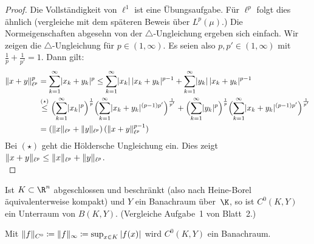 \begin{proof}
    Die Vollständigkeit von $\ell^1$ ist eine Übungsaufgabe. Für $\ell^p$ folgt
    dies ähnlich (vergleiche mit dem späteren Beweis über $L^p(\mu)$.) %
    Die Normeigenschaften abgesehn von der $\triangle$-Ungleichung ergeben sich
    einfach. Wir zeigen die $\triangle$-Ungleichung für $p\in(1,\infty)$. Es
    seien also $p,p'\in(1,\infty)$ mit $\frac{1}{p}+\frac{1}{p'}=1$. Dann gilt:
    \begin{align*}
        \lVert x+y\rVert_{\ell^{p}}^p 
        &= \sum_{k=1}^\infty \lvert x_k+y_k\rvert^p
        \leq \sum_{k=1}^\infty \lvert x_k\rvert \, \lvert x_k+y_k\rvert^{p-1}
        + \sum_{k=1}^\infty \lvert y_k\rvert\, \lvert x_k+y_k\rvert^{p-1}
        \\
        &\overset{(\star)}\leq 
        \Bigl( \sum_{k=1}^\infty \lvert x_k\rvert^p \Bigr)^{\frac{1}{p}}
        \Bigl( \sum_{k=1}^\infty \lvert x_k+y_k\rvert^{(p-1)p'} \Bigr)^{\frac{1}{p'}} 
        +
        \Bigl( \sum_{k=1}^\infty \lvert y_k\rvert^p \Bigr)^{\frac{1}{p}} 
        \Bigl( \sum_{k=1}^\infty \lvert x_k+y_k\rvert^{(p-1)p'} \Bigr)^{\frac{1}{p'}}
        \\
        &= (\lVert x\rVert_{\ell^{p}} + \lVert y\rVert_{\ell^{p}}) \, (\lVert x+y\rVert_{\ell^{p}}^{p-1})
    \end{align*}
    Bei $(\star)$ geht die Höldersche Ungleichung ein.
    Dies zeigt $\lVert x+y\rVert_{\ell^{p}} \leq \lVert x\rVert_{\ell^{p}} + \lVert y\rVert_{\ell^{p}}$.
    \\
\end{proof}

\thmnoindex%
\begin{thEmpty}
    Ist $K\subset\R^n$ abgeschlossen und beschränkt (also nach Heine-Borel
    äquivalenterweise kompakt) und $Y$ ein Banachraum über~$\K$, so ist
    $C^0(K,Y)$ ein Unterraum von $B(K,Y)$. (Vergleiche Aufgabe~1 von Blatt~2.)
    
    \nnSatz
    Mit $\lVert f\rVert_{C^0} \coloneqq \lVert f\rVert_\infty \coloneqq \sup_{x\in K} \, \lvert f(x)\rvert$
    wird $C^0(K,Y)$ ein Banachraum.
\end{thEmpty}

